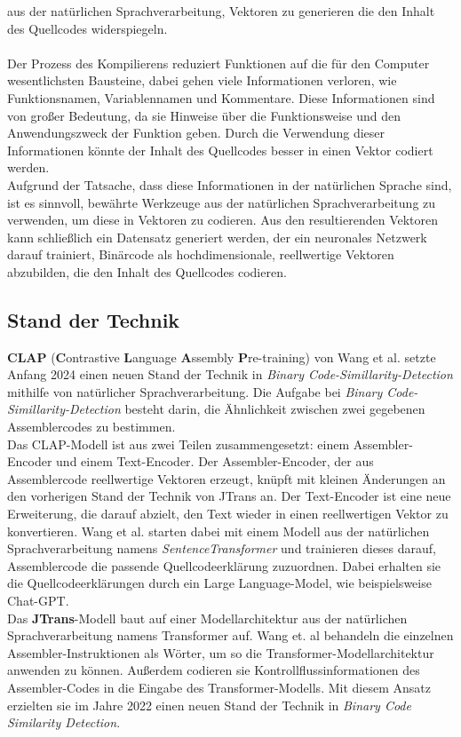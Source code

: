\documentclass[12pt,letterpaper,ngerman]{article}
\begin{document}
aus der natürlichen Sprachverarbeitung, Vektoren zu generieren die 
den Inhalt des Quellcodes widerspiegeln.\\\\
Der Prozess des Kompilierens reduziert Funktionen
auf die für den Computer wesentlichsten Bausteine, dabei gehen viele 
Informationen verloren, wie Funktionsnamen, Variablennamen und
Kommentare. Diese Informationen sind von großer Bedeutung, da
sie Hinweise über die Funktionsweise und den Anwendungszweck der
Funktion geben. Durch die Verwendung dieser Informationen 
könnte der Inhalt des Quellcodes besser in einen Vektor codiert
werden.\\
Aufgrund der Tatsache, dass diese Informationen in der natürlichen 
Sprache sind, ist es sinnvoll, bewährte Werkzeuge aus der natürlichen 
Sprachverarbeitung zu verwenden, um diese in Vektoren zu codieren. 
Aus den resultierenden Vektoren kann schließlich ein Datensatz
generiert werden, der ein neuronales Netzwerk darauf trainiert, 
Binärcode als hochdimensionale, reellwertige Vektoren abzubilden,
die den Inhalt des Quellcodes codieren.
\pagebreak
\subsection{Stand der Technik}
{\bf CLAP} ({\bf C}ontrastive {\bf L}anguage {\bf A}ssembly 
{\bf P}re-training) von Wang et al.
setzte Anfang 2024 einen neuen Stand der Technik in
\textit{Binary Code-Simillarity-Detection}
mithilfe von natürlicher Sprachverarbeitung\cite{clap}.
Die Aufgabe bei 
\textit{Binary Code-Simillarity-Detection}
besteht darin, die Ähnlichkeit zwischen zwei gegebenen 
Assemblercodes zu bestimmen.\\
Das CLAP-Modell ist aus zwei Teilen zusammengesetzt: einem Assembler-Encoder 
und einem Text-Encoder. Der Assembler-Encoder, der aus Assemblercode 
reellwertige Vektoren erzeugt, knüpft mit kleinen Änderungen an den vorherigen
Stand der Technik von JTrans an. Der Text-Encoder ist eine neue Erweiterung,
die darauf abzielt, den Text wieder in einen reellwertigen Vektor zu 
konvertieren. Wang et al. starten dabei mit einem Modell aus der natürlichen 
Sprachverarbeitung namens \textit{SentenceTransformer} und trainieren dieses
darauf, Assemblercode die passende Quellcodeerklärung  zuzuordnen. Dabei 
erhalten sie die Quellcodeerklärungen durch ein Large  Language-Model, wie
beispielsweise Chat-GPT.\\
Das {\bf JTrans}-Modell \cite{jtrans} 
baut auf einer Modellarchitektur aus der natürlichen 
Sprachverarbeitung namens 
Transformer \cite{transformer} auf. 
Wang et. al behandeln die einzelnen Assembler-Instruktionen als Wörter, um so 
die Transformer-Modellarchitektur anwenden zu können. Außerdem codieren sie
Kontrollflussinformationen des Assembler-Codes in die Eingabe des 
Transformer-Modells. Mit diesem Ansatz erzielten sie im Jahre 2022 einen neuen
Stand der Technik in \textit{Binary Code Similarity Detection}.\\
\end{document}
